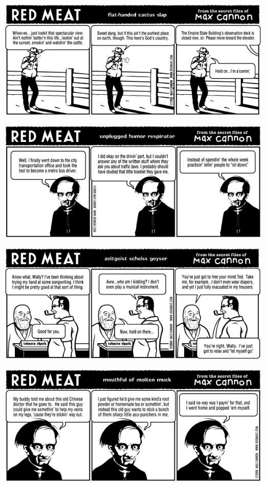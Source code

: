 \documentclass[a4paper,twoside,11pt]{article}
\begin{document}
\includegraphics[width=\textwidth]{redmeat_2000-11-21.png}



\includegraphics[width=\textwidth]{redmeat_2000-11-28.png}



\includegraphics[width=\textwidth]{redmeat_2000-12-05.png}



\includegraphics[width=\textwidth]{redmeat_2000-12-12.png}
\end{document}
